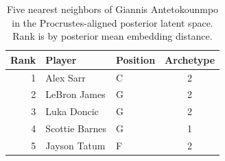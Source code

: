 \begin{table}[htbp]
  \centering\small
  \begin{tabular}{rllc}
    \toprule
    Rank & Player & Position & Archetype \\
    \midrule
    1 & Alex Sarr & C & 2 \\
    2 & LeBron James & G & 2 \\
    3 & Luka Doncic & G & 2 \\
    4 & Scottie Barnes & G & 1 \\
    5 & Jayson Tatum & F & 2 \\
    \bottomrule
  \end{tabular}
  \caption{Five nearest neighbors of Giannis Antetokounmpo in the Procrustes-aligned posterior latent space. Rank is by posterior mean embedding distance.}
  \label{tab:Giannis_Antetokounmpo_neighbors}
\end{table}

